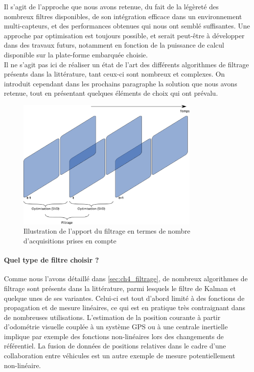 Il s'agit de l'approche que nous avons retenue, du fait de la légèreté des nombreux filtres disponibles, de son intégration efficace dans un environnement multi-capteurs, et des performances obtenues qui nous ont semblé suffisantes. Une approche par optimisation est toujours possible, et serait peut-être à développer dans des travaux futurs, notamment en fonction de la puissance de calcul disponible sur la plate-forme embarquée choisie.\\

Il ne s'agit pas ici de réaliser un état de l'art des différents algorithmes de filtrage présents dans la littérature, tant ceux-ci sont nombreux et complexes. On introduit cependant dans les prochains paragraphe la solution que nous avons retenue, tout en présentant quelques éléments de choix qui ont prévalu.

\begin{figure}
	\centering
	\includegraphics[width=0.8\textwidth]{Chapter4/graphics/why_filter.png}
	\caption{Illustration de l'apport du filtrage en termes de nombre d'acquisitions prises en compte}
	\label{fig:ch4_pourquoi_filtrer}
\end{figure}

\paragraph{Quel type de filtre choisir ?\\}
Comme nous l'avons détaillé dans \ref{sec:ch4_filtrage}, de nombreux algorithmes de filtrage sont présents dans la littérature, parmi lesquels le filtre de Kalman et quelque unes de ses variantes. Celui-ci est tout d'abord limité à des fonctions de propagation et de mesure linéaires, ce qui est en pratique très contraignant dans de nombreuses utilisations. L'estimation de la position courante à partir d'odométrie visuelle couplée à un système GPS ou à une centrale inertielle implique par exemple des fonctions non-linéaires lors des changements de référentiel. La fusion de données de positions relatives dans le cadre d'une collaboration entre véhicules est un autre exemple de mesure potentiellement non-linéaire.\\

